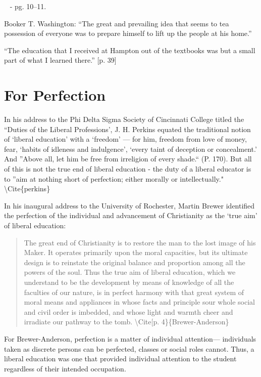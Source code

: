 ~\citep{Griscom:1823vi} - pg. 10--11.

Booker T. Washington: ``The great and prevailing idea that seems to tea possession of everyone was to prepare himself to lift up the people at his home.'' ~\citep[P. 36]{Washington:1952uf}

``The education that I received at Hampton out of the textbooks was but a small part of what I learned there.'' [p. 39]

\section{For Perfection}
\label{forperfection}

In his address to the Phi Delta Sigma Society of Cincinnati College titled the ``Duties of the Liberal Professions', J. H. Perkins equated the traditional notion of `liberal education' with a `freedom' --- for him, freedom from love of money, fear, `habits of idleness and indulgence', `every taint of deception or concealment.' And ''Above all, let him be free from irreligion of every shade.`` (P. 170). But all of this is not the true end of liberal education - the duty of a liberal educator is to ''aim at nothing short of perfection; either morally or intellectually." \textbackslash{}Cite\{perkins\}

In his inaugural address to the University of Rochester, Martin Brewer identified the perfection of the individual and advancement of Christianity as the `true aim' of liberal education:

\begin{quote}

The great end of Christianity is to restore the man to the lost image of his Maker. It operates primarily upon the moral capacities, but its ultimate design is to reinstate the original balance and proportion among all the powers of the soul. Thus the true aim of liberal education, which we understand to be the development by means of knowledge of all the faculties of our nature, is in perfect harmony with that great system of moral means and appliances in whose facts and principle sour whole social and civil order is imbedded, and whose light and warmth cheer and irradiate our pathway to the tomb. \textbackslash{}Cite[p. 4\}\{Brewer-Anderson\}
\end{quote}

For Brewer-Anderson, perfection is a matter of individual attention--- individuals taken as discrete persons can be perfected, classes or social roles cannot. Thus, a liberal education was one that provided individual attention to the student regardless of their intended occupation.

